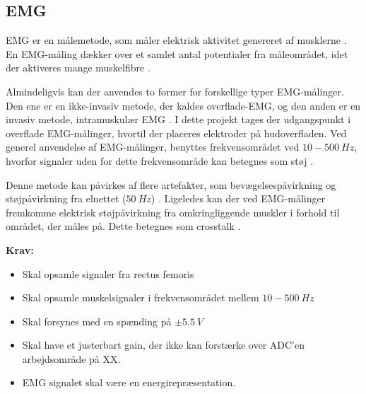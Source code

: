 \subsection{EMG}
EMG er en målemetode, som måler elektrisk aktivitet genereret af musklerne \citep{chowdhury2013}. 
En EMG-måling dækker over et samlet antal potentialer fra måleområdet, idet der aktiveres mange muskelfibre \citep{keenan2012}. 

Almindeligvis kan der anvendes to former for forskellige typer EMG-målinger. Den ene er en ikke-invasiv metode, der kaldes overflade-EMG, og den anden er en invasiv metode, intramuskulær EMG \citep{chowdhury2013, keenan2012}.
I dette projekt tages der udgangspunkt i overflade EMG-målinger, hvortil der placeres elektroder på hudoverfladen. 
Ved generel anvendelse af EMG-målinger, benyttes frekvensområdet ved $10-500~Hz$, hvorfor signaler uden for dette frekvensområde kan betegnes som støj \citep{morre2003, keenan2012}.  

Denne metode kan påvirkes af flere artefakter, som bevægelsespåvirkning og støjpåvirkning fra elnettet ($50~Hz$) \citep{keenan2012}.
Ligeledes kan der ved EMG-målinger fremkomme elektrisk støjpåvirkning fra omkringliggende muskler i forhold til området, der måles på. Dette betegnes som crosstalk \citep{keenan2012}. 
\vspace{3mm}

\textbf{Krav:}
\begin{itemize}
\item Skal opsamle signaler fra rectus femoris
\item Skal opsamle muskelsignaler i frekvensområdet mellem $10-500~Hz$
\item Skal forsynes med en spænding på $\pm5.5~V$ 
\item Skal have et justerbart gain, der ikke kan forstærke over ADC'en arbejdsområde på XX.
\item EMG signalet skal være en energirepræsentation.
\end{itemize}